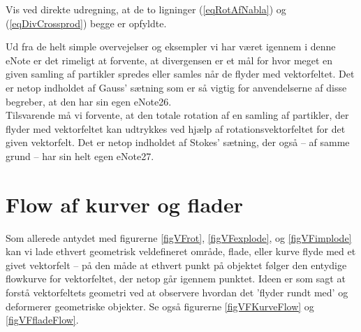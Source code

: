 \begin{exercise}\label{exercRotDivIdent}
Vis ved direkte udregning, at de to ligninger (\ref{eqRotAfNabla}) og (\ref{eqDivCrossprod}) begge er opfyldte.
\end{exercise}




\begin{info}
Ud fra de helt simple overvejelser og eksempler vi har været igennem i denne eNote er det rimeligt at forvente, at divergensen er et mål for hvor meget
en given samling af partikler spredes eller samles når de flyder med vektorfeltet. Det er netop indholdet af Gauss' sætning som er så vigtig for
anvendelserne af disse begreber, at den har sin egen eNote26. \\

 Tilsvarende må vi forvente, at den totale rotation af en samling af partikler, der flyder med vektorfeltet kan udtrykkes ved hjælp af rotationsvektorfeltet for det given vektorfelt. Det er netop indholdet af Stokes' sætning, der også -- af samme grund -- har sin helt egen eNote27.
\end{info}

\section{Flow af kurver og flader}\label{secKurveFladeFlow}
Som allerede antydet med figurerne \ref{figVFrot}, \ref{figVFexplode}, og \ref{figVFimplode} kan vi lade ethvert geometrisk veldefineret område, flade, eller kurve flyde med et givet vektorfelt --  på den måde  at ethvert punkt på objektet følger den entydige flowkurve for vektorfeltet, der netop går igennem punktet. Ideen er som sagt at forstå vektorfeltets geometri ved at observere hvordan det 'flyder rundt med' og deformerer geometriske
objekter. Se også figurerne \ref{figVFKurveFlow} og \ref{figVFfladeFlow}.



